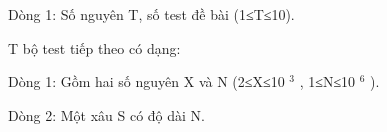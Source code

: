 Dòng 1: Số nguyên T, số test đề bài (1≤T≤10).  

   T bộ test tiếp theo có dạng:  

   Dòng 1: Gồm hai số nguyên X và N (2≤X≤10   $^    3   $   , 1≤N≤10   $^    6   $   ).  

   Dòng 2: Một xâu S có độ dài N.